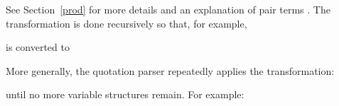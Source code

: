 \noindent See Section~\ref{prod} for more details and an explanation
of pair terms .
The transformation is done recursively so that, for example,



\noindent is converted to


\noindent More generally,
the quotation parser repeatedly applies the transformation:


\noindent until no more variable structures remain. For example:

\begin{flushleft}
\end{flushleft}

